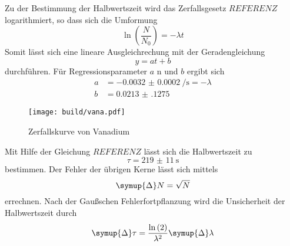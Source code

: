 Zu der Bestimmung der Halbwertszeit wird das Zerfallsgesetz $REFERENZ$ logarithmiert, so dass sich die Umformung
\begin{equation}
\ln \left (\frac{N}{N_0} \right ) = - \lambda t 
\end{equation}
Somit lässt sich eine lineare Ausgleichrechung mit der Geradengleichung
\begin{equation}
    y = at + b 
\end{equation}
durchführen. 
Für Regressionsparameter $a$ n und $b$ ergibt sich
\begin{align*}
    a &= \SI{-0.0032(2)}{\per\second} = - \lambda\\
    b &= \num{0.0213(1275)}
\end{align*}
\begin{figure}
    \centering
    \caption{Zerfallskurve von Vanadium}
    \label{fig:vana}
    \texttt{[image: build/vana.pdf]}
\end{figure}
Mit Hilfe der Gleichung $REFERENZ$ lässt sich die Halbwertszeit zu
\begin{equation*}
\tau = \SI{219(11)}{\second}
\end{equation*}
bestimmen.
Der Fehler der übrigen Kerne lässt sich mittels
\begin{equation}
    \symup{\Delta} N = \sqrt{N} 
\end{equation}
errechnen.
Nach der Gaußschen Fehlerfortpflanzung wird die Unsicherheit der Halbwertszeit durch
\begin{equation}
    \symup{\Delta} \tau = \frac{\ln \left (2 \right )}{\lambda^2} \symup{\Delta} \lambda
\end{equation}
